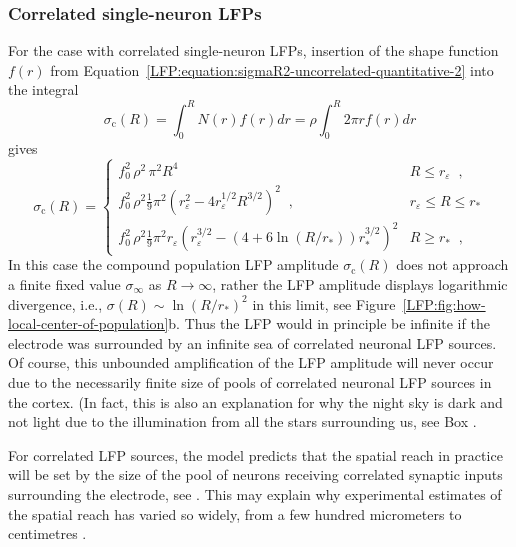 \subsubsection{Correlated single-neuron LFPs}

For the case with correlated single-neuron LFPs, insertion of the shape function $f(r)$ from 
Equation~\ref{LFP:equation:sigmaR2-uncorrelated-quantitative-2}  into the integral
\begin{equation}
\sigma_\text{c}(R)  = \int_0^R N(r)  f(r) dr  = \rho \int_0^R 2 \pi r  f(r) dr 
\label{LFP:equation:sigmaR2-correlated-quantitative}
\end{equation}
gives
\begin{equation}
  \sigma_\text{c}(R) =
  \begin{cases}
    f_0^2 \, \rho^2 \, \pi^2 R^4                   &   R \le r_\varepsilon   \;\;,\\
    f_0^2 \, \rho^2 \frac{1}{9} \pi^2 \left( r_\varepsilon^2 - 4 r_\varepsilon^{1/2} R^{3/2} \right)^2 \;\;, &   r_\varepsilon \le R \le r_* \\
    f_0^2 \, \rho^2 \frac{1}{9} \pi ^2 r_{\varepsilon } \left(r_{\varepsilon }^{3/2}-\left(4+6 \ln\left(R/r_*\right)\right) r_*^{3/2}\right)^2
  & R \ge r_* \;\;,
  \end{cases} 
  \label{LFP:equation:sigmaR2-correlated-quantitative-2}  
\end{equation}
In this case the compound population LFP amplitude $\sigma_\text{c}(R)$ does not approach a finite fixed value $\sigma_\infty$ as $R \rightarrow \infty$, rather the LFP amplitude
displays logarithmic divergence, i.e., $\sigma (R) \sim \ln(R/r_*)^2$ in this limit, see Figure~\ref{LFP:fig:how-local-center-of-population}b.
Thus the LFP would in principle be infinite if the electrode was surrounded by an infinite sea of correlated neuronal LFP sources. Of course, this unbounded amplification of the LFP amplitude will never occur  
due to the necessarily finite size of pools of correlated neuronal LFP sources in the cortex. (In fact, this is also an explanation for 
why the night sky is dark and not light due to the illumination from all the stars surrounding us, see  Box .

For correlated LFP sources, the model predicts that the spatial reach in practice will be set by the size of the pool of neurons receiving correlated synaptic inputs surrounding the electrode, see . This may explain why experimental estimates of the spatial reach has varied so widely, from a few hundred micrometers to centimetres .

